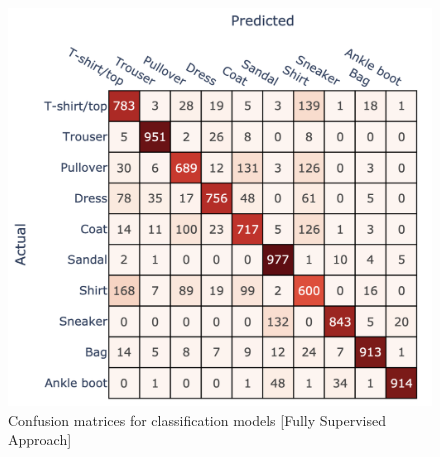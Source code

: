 \begin{figure}[!htb]
\begin{minipage}{0.33\textwidth}
    \end{minipage}\hfill
    \begin{minipage}{0.33\textwidth}
        \centering
        \includegraphics[width=1\linewidth]{images/CM_FullySupervised_CNN.png}
    \end{minipage}
    \caption{\footnotesize Confusion matrices for classification models [Fully Supervised Approach]}
    \label{fig:confusion_matrices_FullySupervised}
 \end{figure}



